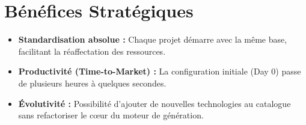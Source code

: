 \documentclass[11pt,a4paper]{article}
\begin{document}
\section{Bénéfices Stratégiques}
\begin{itemize}[label=\textcolor{primary}{\checkmark}]
    \item \textbf{Standardisation absolue :} Chaque projet démarre avec la même base, facilitant la réaffectation des ressources.
    \item \textbf{Productivité (Time-to-Market) :} La configuration initiale (Day 0) passe de plusieurs heures à quelques secondes.
    \item \textbf{Évolutivité :} Possibilité d'ajouter de nouvelles technologies au catalogue sans refactoriser le cœur du moteur de génération.
\end{itemize}
\end{document}
